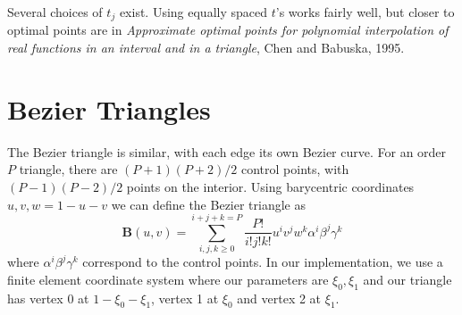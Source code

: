 \documentclass{article}
\begin{document}

    
Several choices of $t_j$ exist. Using equally spaced $t$'s works fairly well, but closer to optimal points are in \textit{Approximate optimal points for polynomial interpolation of real functions in an interval and in a triangle}, Chen and Babuska, 1995.
\section{Bezier Triangles}
The Bezier triangle is similar, with each edge its own Bezier curve. For an order $P$ triangle, there are $(P+1)(P+2)/2$ control points, with $(P-1)(P-2)/2$ points on the interior. Using barycentric coordinates $u,v,w = 1-u-v$ we can define the Bezier triangle as 
\[
\mathbf{B}(u,v) = \displaystyle\sum_{i,j,k\geq 0}^{i+j+k=P} \frac{P!}{i!j!k!}u^iv^jw^k \alpha^i\beta^j\gamma^k 
\]
where $\alpha^i\beta^j\gamma^k$ correspond to the control points. In our implementation, we use a finite element coordinate system where our parameters are $\xi_0,\xi_1$ and our triangle has vertex 0 at $1-\xi_0-\xi_1$, vertex 1 at $\xi_0$ and vertex 2 at $\xi_1$.
\end{document}

